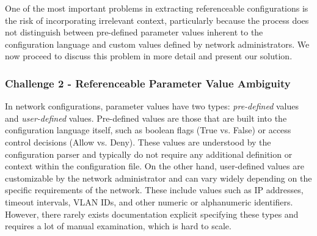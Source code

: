
One of the most important problems in extracting referenceable configurations
is the risk of incorporating irrelevant context, particularly because the
process does not distinguish between pre-defined parameter values inherent to the configuration language and custom values defined by network administrators. 
We now proceed to discuss this problem in more detail and present our solution.

\subsubsection{Challenge 2 - Referenceable Parameter Value Ambiguity}

In network configurations, parameter values have two types: \textit{pre-defined} values and \textit{user-defined} values. Pre-defined values are those that are built into the configuration language itself, such as boolean flags (True vs. False) or access control decisions (Allow vs. Deny). These values are understood by the configuration parser and typically do not require any additional definition or context within the configuration file. On the other hand, user-defined values are customizable by the network administrator and can vary widely depending on the specific requirements of the network. These include values such as IP addresses, timeout intervals, VLAN IDs, and other numeric or alphanumeric identifiers. However, there rarely exists documentation explicit specifying these types and requires a lot of manual examination, which is hard to scale.

